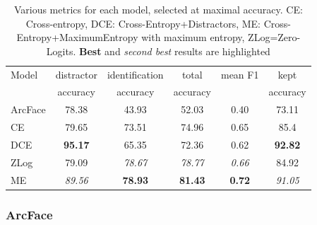\begin{table}[]
    \centering
    \begin{tabular}{|l|c|c|c|c|c|}
    \hline
        Model & distractor     & identification   & total           & mean F1       & kept \\
              & accuracy       &   accuracy       & accuracy        &               & accuracy \\
        \hline
        \hline
        ArcFace & 78.38        & 43.93            & 52.03           & 0.40          & 73.11 \\
        \hline
        CE   & 79.65           & 73.51            & 74.96           & 0.65          & 85.4 \\
        \hline
        DCE & \textbf{95.17}   & 65.35            & 72.36           & 0.62          & \textbf{92.82} \\
        \hline
        ZLog & 79.09          & \emph{78.67}      & \emph{78.77}    & \emph{0.66}   & 84.92 \\
        \hline
        ME & \emph{89.56}     & \textbf{78.93}    & \textbf{81.43}  & \textbf{0.72} & \emph{91.05} \\
        \hline
    \end{tabular}
    \caption{Various metrics for each model, selected at maximal accuracy. CE: Cross-entropy, DCE: Cross-Entropy+Distractors, ME: Cross-Entropy+MaximumEntropy with maximum entropy, ZLog=Zero-Logits. \textbf{Best} and \emph{second best} results are highlighted}
    \label{tab:frmetrics}
\end{table}


\subsubsection{ArcFace}

